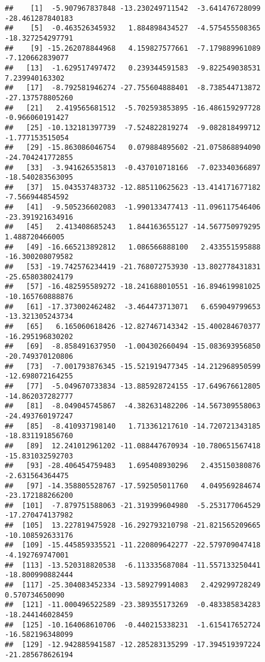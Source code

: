 \documentclass[
]{article}
\begin{document}
\begin{verbatim}
##    [1]  -5.907967837848 -13.230249711542  -3.641476728099 -28.461287840183
##    [5]  -0.463526345932   1.884898434527  -4.575455508365 -18.327254297791
##    [9] -15.262078844968   4.159827577661  -7.179889961089  -7.120662839077
##   [13]  -1.629517497472   0.239344591583  -9.822549038531   7.239940163302
##   [17]  -8.792581946274 -27.755604888401  -8.738544713872 -27.137578805260
##   [21]   2.419565681512  -5.702593853895 -16.486159297728  -0.966060191427
##   [25] -10.132181397739  -7.524822819274  -9.082818499712  -1.777153515054
##   [29] -15.863086046754   0.079884895602 -21.075868894090 -24.704241772855
##   [33]  -3.941626535813  -0.437010718166  -7.023340366897 -18.540283563095
##   [37]  15.043537483732 -12.885110625623 -13.414171677182  -7.566944854592
##   [41]  -9.505236602083  -1.990133477413 -11.096117546406 -23.391921634916
##   [45]   2.413408685243   1.844163655127 -14.567750979295   1.488720466005
##   [49] -16.665213892812   1.086566888100   2.433551595888 -16.300208079582
##   [53] -19.742576234419 -21.768072753930 -13.802778431831 -25.658038024179
##   [57] -16.482595589272 -18.241688010551 -16.894619981025 -10.165760888876
##   [61] -17.373002462482  -3.464473713071   6.659049799653 -13.321305243734
##   [65]   6.165060618426 -12.827467143342 -15.400284670377 -16.295196830202
##   [69]  -8.858491637950  -1.004302660494 -15.083693956850 -20.749370120806
##   [73]  -7.001793876345 -15.521919477345 -14.212968950599 -12.698072164255
##   [77]  -5.049670733834 -13.885928724155 -17.649676612805 -14.862037282777
##   [81]  -8.049045745867  -4.382631482206 -14.567309558063 -24.493760197247
##   [85]  -8.410937198140   1.713361217610 -14.720721343185 -18.831191856760
##   [89]  12.241012961202 -11.088447670934 -10.780651567418 -15.831032592703
##   [93] -28.406454759483   1.695408930296   2.435150380876  -2.631564364475
##   [97] -14.358805528767 -17.592505011760   4.049569284674 -23.172188266200
##  [101]  -7.879751588063 -21.319399604980  -5.253177064529 -17.270474137982
##  [105]  13.227819475928 -16.292793210798 -21.821565209665 -10.108592633176
##  [109] -15.445859335521 -11.220809642277 -22.579709047418  -4.192769747001
##  [113] -13.520318820538  -6.113335687084 -11.557133250441 -18.800990882444
##  [117] -25.304083452334 -13.589279914083   2.429299728249   0.570734650090
##  [121] -11.000496522589 -23.389355173269  -0.483385834283 -18.244146028459
##  [125] -10.164068610706  -0.440215338231  -1.615417652724 -16.582196348099
##  [129] -12.942885941587 -12.285283135299 -17.394519397224 -21.285678626194

\end{verbatim}
\end{document}
